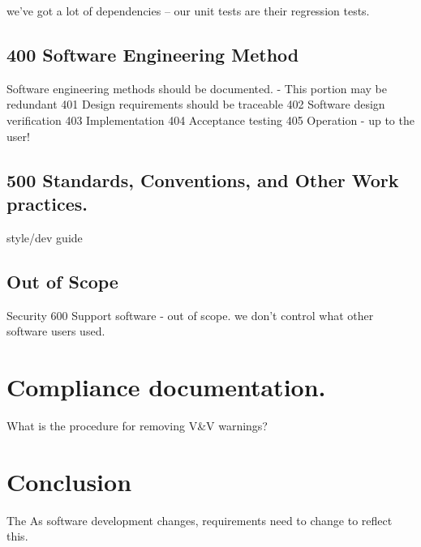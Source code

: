\documentclass{anstrans}
\begin{document}
we've got a lot of dependencies -- our unit tests are their regression tests.

\subsection{400 Software Engineering Method}
Software engineering methods should be documented.
- This portion may be redundant
401 Design requirements should be traceable
402 Software design verification
403 Implementation
404 Acceptance testing
405 Operation - up to the user!

\subsection{500 Standards, Conventions, and Other Work practices.}

style/dev guide


\subsection{Out of Scope}
Security
600 Support software - out of scope. we don't control what other software users used. 


\section{Compliance documentation.}
What is the procedure for removing V\&V warnings?


\section{Conclusion}

The 
As software development changes, requirements need to change to reflect this.



\end{document}
